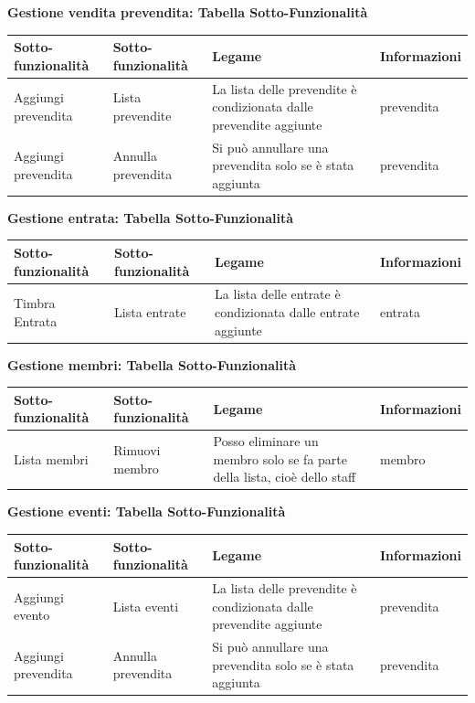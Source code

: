 \documentclass[a4paper]{article}
\begin{document}
\textbf{Gestione vendita prevendita: Tabella Sotto-Funzionalità}

\begin{center}
    \begin{tabularx}{1\textwidth}{|X|X|X|X|}
    \hline
    \textbf{Sotto-funzionalità} & \textbf{Sotto-funzionalità} & \textbf{Legame} & \textbf{Informazioni}\\
    \hline
    \hline
    Aggiungi prevendita & Lista prevendite & La lista delle prevendite è condizionata dalle prevendite aggiunte & prevendita\\
    \hline
    Aggiungi prevendita & Annulla prevendita & Si può annullare una prevendita solo se è stata aggiunta & prevendita\\
    \hline
    \end{tabularx}
\end{center}

\textbf{Gestione entrata: Tabella Sotto-Funzionalità}

\begin{center}
    \begin{tabularx}{1\textwidth}{|X|X|X|X|}
    \hline
    \textbf{Sotto-funzionalità} & \textbf{Sotto-funzionalità} & \textbf{Legame} & \textbf{Informazioni}\\
    \hline
    \hline
    Timbra Entrata & Lista entrate & La lista delle entrate è condizionata dalle entrate aggiunte & entrata\\
    \hline
    \end{tabularx}
\end{center}

\textbf{Gestione membri: Tabella Sotto-Funzionalità}

\begin{center}
    \begin{tabularx}{1\textwidth}{|X|X|X|X|}
    \hline
    \textbf{Sotto-funzionalità} & \textbf{Sotto-funzionalità} & \textbf{Legame} & \textbf{Informazioni}\\
    \hline
    \hline
    Lista membri & Rimuovi membro & Posso eliminare un membro solo se fa parte della lista, cioè dello staff & membro\\
    \hline
    \end{tabularx}
\end{center}

\textbf{Gestione eventi: Tabella Sotto-Funzionalità}

\begin{center}
    \begin{tabularx}{1\textwidth}{|X|X|X|X|}
    \hline
    \textbf{Sotto-funzionalità} & \textbf{Sotto-funzionalità} & \textbf{Legame} & \textbf{Informazioni}\\
    \hline
    \hline
    Aggiungi evento & Lista eventi & La lista delle prevendite è condizionata dalle prevendite aggiunte & prevendita\\
    \hline
    Aggiungi prevendita & Annulla prevendita & Si può annullare una prevendita solo se è stata aggiunta & prevendita\\
    \hline
    \end{tabularx}
\end{center}
\end{document}
